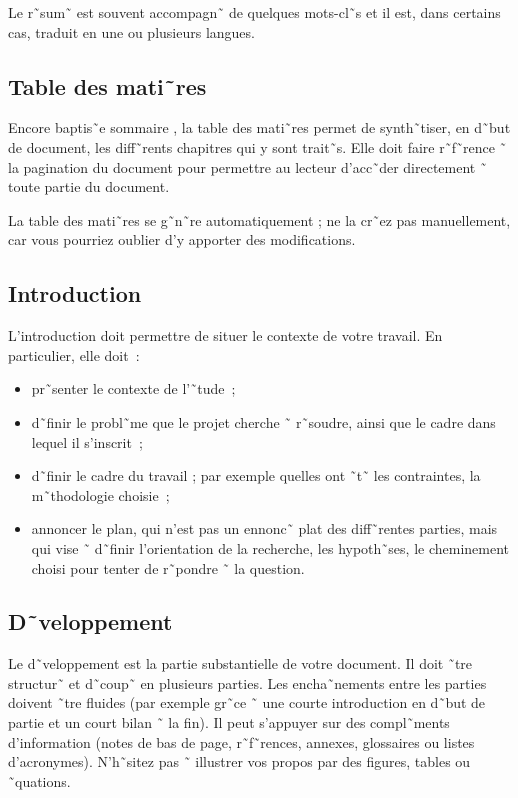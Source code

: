 Le r˜sum˜ est souvent accompagn˜ de quelques mots-cl˜s et il est, dans
certains cas, traduit en une ou plusieurs langues.

\subsection{Table des mati˜res}

Encore baptis˜e \og{} sommaire \fg{}, la table des mati˜res permet de
synth˜tiser, en d˜but de document, les diff˜rents chapitres qui y sont
trait˜s. Elle doit faire
r˜f˜rence ˜ la pagination du document pour permettre au lecteur
d'acc˜der directement ˜ toute partie du document. 

La table des mati˜res se g˜n˜re automatiquement ; ne la cr˜ez pas
manuellement, car vous pourriez oublier d'y apporter des
modifications.

\subsection{Introduction}

L'introduction doit permettre de situer le contexte de votre travail. En
particulier, elle doit~:
\begin{itemize}
\item pr˜senter le contexte de l'˜tude~;
\item d˜finir le probl˜me que le projet cherche ˜ r˜soudre, ainsi
    que le cadre dans lequel il s'inscrit~; 
\item d˜finir le cadre du travail ; par exemple quelles ont ˜t˜ les
  contraintes, la m˜thodologie choisie~;
\item annoncer le plan, qui n'est pas un ennonc˜ plat des diff˜rentes parties,
  mais qui vise ˜ d˜finir l'orientation de la recherche, les hypoth˜ses, le
  cheminement choisi pour tenter de r˜pondre ˜ la question.
\end{itemize}


\subsection{D˜veloppement}

Le d˜veloppement est la partie substantielle de votre document. Il doit ˜tre
structur˜ et d˜coup˜ en plusieurs parties. Les encha˜nements entre les parties
doivent ˜tre fluides (par exemple gr˜ce ˜ une courte introduction en d˜but de
partie et un court bilan ˜ la fin). Il peut s'appuyer sur des compl˜ments
d'information (notes de bas de page, r˜f˜rences, annexes, glossaires ou listes
d'acronymes). N'h˜sitez pas ˜ illustrer vos propos par des figures, tables
ou ˜quations.


